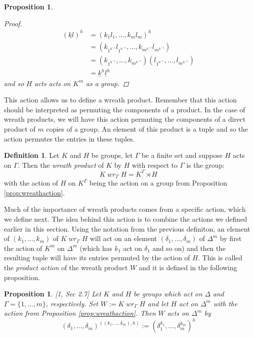 \documentclass[]{article}
\newtheorem{prop}[thm]{Proposition}
\theoremstyle{definition}
\newtheorem{defn}[thm]{Definition}
\begin{document}
\begin{prop}
\begin{proof}
	\begin{align*}
		(\underline{kl})^h & = (k_1l_1,\dots,k_ml_m)^h \\
		& = (k_{1^{h^{-1}}}l_{1^{h^{-1}}},\dots,k_{m^{h^{-1}}}l_{m^{h^{-1}}}) \\
		& = (k_{1^{h^{-1}}},\dots,k_{m^{h^{-1}}})(l_{1^{h^{-1}}},\dots,l_{m^{h^{-1}}}) \\
		& = \underline{k}^h \underline{l}^h
	\end{align*}
	and so $H$ acts acts on $K^m$ as a group.
	\end{proof}
\end{prop}
This action allows us to define a wreath product. Remember that this action should be interpreted as permuting the components of a product. In the case of wreath products, we will have this action permuting the components of a direct product of $m$ copies of a group. An element of this product is a tuple and so the action permutes the entries in these tuples.
\begin{defn} \label{defn:wreath}
	Let $K$ and $H$ be groups, let $\Gamma$ be a finite set and suppose $H$ acts on $\Gamma$. Then the \emph{wreath product} of $K$ by $H$ with respect to $\Gamma$ is the group: 
	$$K \; wr_\Gamma \; H = K^\Gamma \rtimes H$$
	with the action of $H$ on $K^\Gamma$ being the action on a group from Proposition \ref{prop:wreathaction}.
\end{defn}

Much of the importance of wreath products comes from a specific action, which we define next. The idea behind this action is to combine the actions we defined earlier in this section. Using the notation from the previous definiton, an element of $(k_1,\dots,k_m)$ of $K \; wr_\Gamma \; H$ will act on an element $(\delta_1,\dots,\delta_m)$ of $\Delta^m$ by first the action of $K^m$ on $\Delta^m$ (which has $k_1$ act on $\delta_1$ and so on) and then the resulting tuple will have its entries permuted by the action of $H$. This is called the \emph{product action} of the wreath product $W$ and it is defined in the following proposition.

\begin{prop} \emph{[1, Sec 2.7]} 
	Let $K$ and $H$ be groups which act on $\Delta$ and $\Gamma=\{1,\dots,m \}$, respectively. Set $W:=K \; wr_\Gamma \; H$ and let $H$ act on $\Delta^m$ with the action from Proposition \ref{prop:wreathaction}. Then $W$ acts on $\Delta^m$ by
	$$ (\delta_1,\dots,\delta_m)^{((k_1,\dots,k_m),h)} := (\delta_1^{k_1},\dots, \delta_m^{k_m})^h $$
\end{prop}
\end{document}
